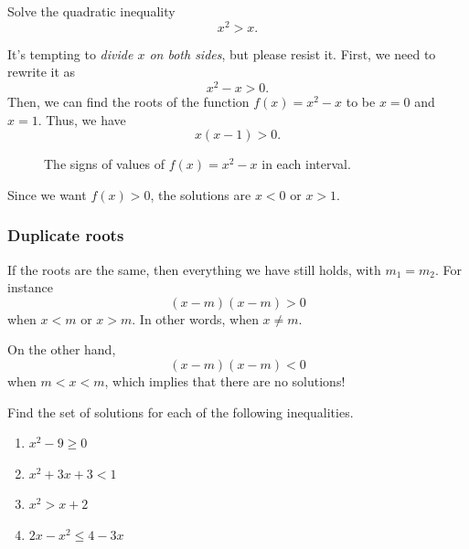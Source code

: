 \begin{frame}[t]
\begin{ex}
Solve the quadratic inequality
\[x^2 > x.\]
\end{ex}
\begin{sol}
It's tempting to \textit{divide $x$ on both sides}, but please resist it. First, we need to rewrite it as
\[x^2 - x > 0.\]
Then, we can find the roots of the function $f(x) = x^2-x$ to be $x=0$ and $x=1$. Thus, we have
\[x(x-1) > 0.\]
\end{sol}
\end{frame}

\begin{frame}
\begin{sol}
\begin{figure}[h!]
\centering
{}
\caption{The signs of values of $f(x)=x^2-x$ in each interval.}
\end{figure}
Since we want $f(x) > 0$, the solutions are $x<0$ or $x>1$.
\end{sol}
\end{frame}

\begin{frame}
\frametitle{Duplicate roots}
If the roots are the same, then everything we have still holds, with $m_1 = m_2$. For instance
\[(x-m)(x-m) >0\] 
when $x<m$ or $x>m$. In other words, when $x \neq m$.

On the other hand,
\[(x-m)(x-m) < 0\]
when $m < x < m$, which implies that there are no solutions!
\end{frame}

\begin{frame}
\begin{exercisebox}{}{}
Find the set of solutions for each of the following inequalities.
\begin{enumerate}
\item $x^2 - 9 \geq 0$
\item $x^2+3x+3 < 1$
\item $x^2 > x+2$
\item $2x-x^2 \leq 4-3x$
\end{enumerate}
\end{exercisebox}
\end{frame}

